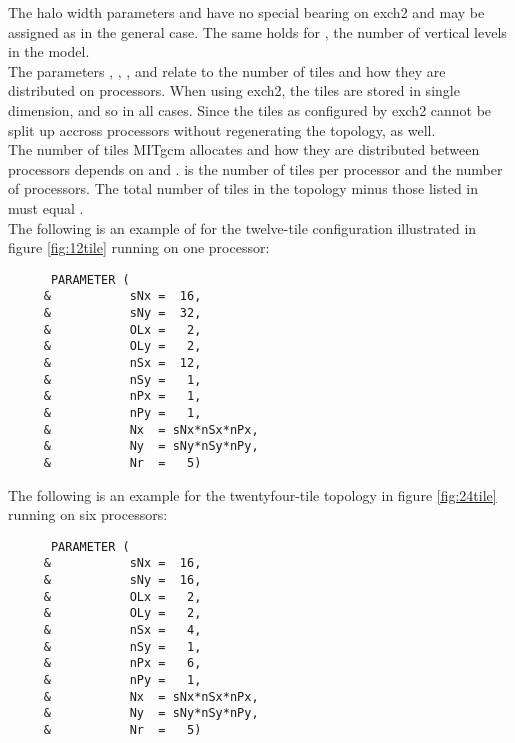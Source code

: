 The halo width parameters  and 
have no special bearing on exch2 and may be assigned as in the general
case. The same holds for , the number of vertical 
levels in the model.\\

The parameters , ,
, and  relate to the number of
tiles and how they are distributed on processors.  When using exch2,
the tiles are stored in single dimension, and so
 in all cases.  Since the tiles as
configured by exch2 cannot be split up accross processors without
regenerating the topology,  as well. \\

The number of tiles MITgcm allocates and how they are distributed
between processors depends on  and
.   is the number of tiles per
processor and  the number of processors.  The total
number of tiles in the topology minus those listed in
 must equal . \\

The following is an example of  for the twelve-tile
configuration illustrated in figure \ref{fig:12tile} running on 
one processor: \\

\begin{verbatim}
      PARAMETER (
     &           sNx =  16,
     &           sNy =  32,
     &           OLx =   2,
     &           OLy =   2,
     &           nSx =  12,
     &           nSy =   1,
     &           nPx =   1,
     &           nPy =   1,
     &           Nx  = sNx*nSx*nPx,
     &           Ny  = sNy*nSy*nPy,
     &           Nr  =   5)
\end{verbatim}

The following is an example for the twentyfour-tile topology in figure
\ref{fig:24tile} running on six processors:

\begin{verbatim}
      PARAMETER (
     &           sNx =  16,
     &           sNy =  16,
     &           OLx =   2,
     &           OLy =   2,
     &           nSx =   4,
     &           nSy =   1,
     &           nPx =   6,
     &           nPy =   1,
     &           Nx  = sNx*nSx*nPx,
     &           Ny  = sNy*nSy*nPy,
     &           Nr  =   5)
\end{verbatim}





